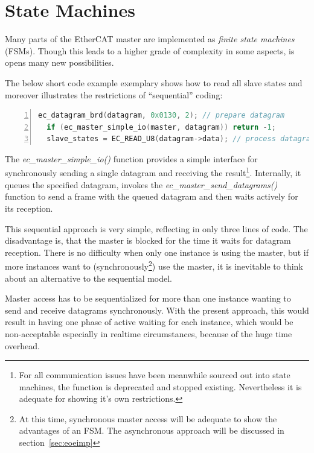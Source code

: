 \documentclass[a4paper,12pt,BCOR6mm,bibtotoc,idxtotoc]{scrbook}
\begin{document}

\chapter{State Machines}
\label{sec:fsm}

Many parts of the EtherCAT master are implemented as \textit{finite state
machines} (FSMs). Though this leads
to a higher grade of complexity in some aspects, is opens many new
possibilities.

The below short code example exemplary shows how to read all slave
states and moreover illustrates the restrictions of ``sequential''
coding:

\begin{lstlisting}[gobble=2,language=C,numbers=left]
  ec_datagram_brd(datagram, 0x0130, 2); // prepare datagram
  if (ec_master_simple_io(master, datagram)) return -1;
  slave_states = EC_READ_U8(datagram->data); // process datagram
\end{lstlisting}

The \textit{ec\_master\_simple\_io()} function provides a simple interface for
synchronously sending a single datagram and receiving the result\footnote{For
all communication issues have been meanwhile sourced out into state machines,
the function is deprecated and stopped existing. Nevertheless it is adequate
for showing it's own restrictions.}. Internally, it queues the specified
datagram, invokes the \textit{ec\_master\_send\_datagrams()} function to send
a frame with the queued datagram and then waits actively for its reception.

This sequential approach is very simple, reflecting in only three
lines of code. The disadvantage is, that the master is blocked for the
time it waits for datagram reception. There is no difficulty when only
one instance is using the master, but if more instances want to
(synchronously\footnote{At this time, synchronous master access will
  be adequate to show the advantages of an FSM. The asynchronous
  approach will be discussed in section~\ref{sec:eoeimp}}) use the
master, it is inevitable to think about an alternative to the
sequential model.

Master access has to be sequentialized for more than one instance
wanting to send and receive datagrams synchronously. With the present
approach, this would result in having one phase of active waiting for
each instance, which would be non-acceptable especially in realtime
circumstances, because of the huge time overhead.
\end{document}

